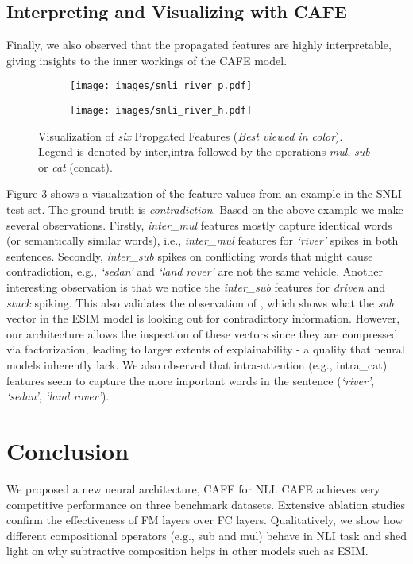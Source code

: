 \documentclass[11pt,a4paper]{article}
\begin{document}
\subsection{Interpreting and Visualizing with CAFE}

Finally, we also observed that the propagated features are highly interpretable, giving insights to the inner workings of the CAFE model.
\begin{figure}[ht!]
  \centering
 \begin{subfigure}[b]{0.44\textwidth}
   \texttt{[image: images/snli\_river\_p.pdf]}
   \label{fig:ex1a}
\end{subfigure}
\vspace{-1em}
\begin{subfigure}[b]{0.44\textwidth}
   \texttt{[image: images/snli\_river\_h.pdf]}
   \label{fig:ex1bb}
\end{subfigure}
\caption{Visualization of \textit{six} Propgated Features (\textit{Best viewed in color}). Legend is denoted by inter,intra followed by the operations \textit{mul}, \textit{sub} or \textit{cat} (concat).} \label{cafe_analysis}
\end{figure}
Figure \ref{cafe_analysis} shows a visualization of the feature values from an example in the SNLI test set. The ground truth is \textit{contradiction}. Based on the above example we make several observations. Firstly, \textit{inter\_mul} features mostly capture identical words (or semantically similar words), i.e., \textit{inter\_mul} features for \textit{`river'} spikes in both sentences. Secondly, \textit{inter\_sub} spikes on conflicting words that might cause contradiction, e.g., \textit{`sedan'} and \textit{`land rover'} are not the same vehicle. Another interesting observation is that we notice the \textit{inter\_sub} features for \textit{driven} and \textit{stuck} spiking. This also validates the observation of \cite{DBLP:conf/acl/ChenZLWJI17}, which shows what the \textit{sub} vector in the ESIM model is looking out for contradictory information. However, our architecture allows the inspection of these vectors since they are compressed via factorization, leading to larger extents of explainability - a quality that neural models inherently lack. We also observed that intra-attention (e.g., intra\_cat) features seem to capture the more important words in the sentence (\textit{`river'}, \textit{`sedan'}, \textit{`land rover'}).



\section{Conclusion}
We proposed a new neural architecture, CAFE for NLI. CAFE achieves very competitive performance on three
benchmark datasets. Extensive ablation studies confirm the effectiveness of FM layers over FC layers. Qualitatively, we show how different compositional operators (e.g., sub and mul) behave in NLI task and shed light on why subtractive composition helps in other models such as ESIM.





\end{document}
